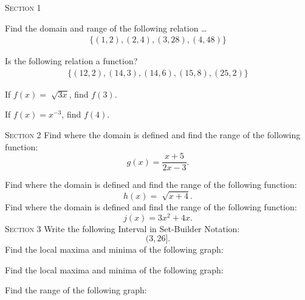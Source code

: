 \documentclass[addpoints,12pt]{exam}
\begin{document}
\vspace{0.25in}
\textsc{Section 1}
\begin{questions}
	\question[10] Find the domain and range of the following relation \ldots
		\begin{align*}
			\{(1,2), (2,4), (3,28), (4, 48)\}
		\end{align*}

\vspace{1.5in}

	\question[10] Is the following relation a function?
    \begin{align*}
    	\{(12,2), (14,3), (14,6), (15, 8), (25,2)\}
    \end{align*}
    
\vspace{1.5in}

	\question[10] If $f(x)=\sqrt[]{3x}$, find $f(3)$.
    
\vspace{1.5in}
	\question[10] If $f(x) = x^{-3}$, find $f(4)$.
    
\vspace{1.5in}
\textsc{Section 2}
	\question[10] Find where the domain is defined and find the range of the following function: $$g(x)=\frac{x+5}{2x-3}.$$
    
\vspace{1.5in}
	\question[10] Find where the domain is defined and find the range of the following function: $$h(x)=\sqrt[]{x+4}.$$
\vspace{1.5in}
	\question[10] Find where the domain is defined and find the range of the following function: $$j(x)=3x^2 +4x.$$
    \vspace{1.5in}
    \textsc{Section 3}
	\question[10] Write the following Interval in Set-Builder Notation: $$(3,26].$$
    \vspace{1.5in}
    \question[10] Find the local maxima and minima of the following graph:
    	
        
\vspace{1.5in}
    \question[10] Find the local maxima and minima of the following graph:


\vspace{1.5in}
    \question[10] Find the range of the following graph:
	
    

\end{questions}
\end{document}
